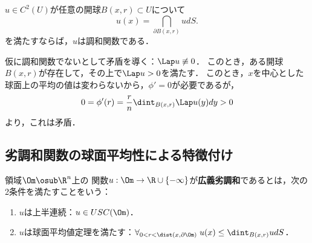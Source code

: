 \documentclass[uplatex,dvipdfmx]{jsreport}
\begin{document}
\begin{proposition}
    $u\in C^2(U)$が任意の開球$B(x,r)\subset U$について
    \[u(x)=\dint_{\partial B(x,r)}udS.\]
    を満たすならば，$u$は調和関数である．
\end{proposition}
\begin{Proof}
    仮に調和関数でないとして矛盾を導く：$\Lap u\not\equiv0$．
    このとき，ある開球$B(x,r)$が存在して，その上で$\Lap u>0$を満たす．
    このとき，$x$を中心とした球面上の平均の値は変わらないから，$\phi'=0$が必要であるが，
    \[0=\phi'(r)=\frac{r}{n}\dint_{B(x,r)}\Lap u(y)dy>0\]
    より，これは矛盾．
\end{Proof}

\subsection{劣調和関数の球面平均性による特徴付け}

\begin{tcolorbox}[colframe=ForestGreen, colback=ForestGreen!10!white,breakable,colbacktitle=ForestGreen!40!white,coltitle=black,fonttitle=\bfseries\sffamily,
title=]
\end{tcolorbox}

\begin{definition}
    領域$\Om\osub\R^n$上の
    関数$u:\Om\to\R\cup\{-\infty\}$が\textbf{広義劣調和}であるとは，次の2条件を満たすことをいう：
    \begin{enumerate}
        \item $u$は上半連続：$u\in USC(\Om)$．
        \item $u$は球面平均値定理を満たす：$\forall_{0<r<\dist(x,\partial\Om)}\;u(x)\le\dint_{B(x,r)}udS$．
    \end{enumerate}
\end{definition}
\end{document}

